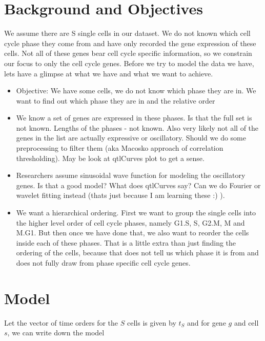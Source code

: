 \documentclass[11pt]{article}
\begin{document}
\section{Background and Objectives}

We assume there are S single cells in our dataset. We do not known which cell cycle phase they come from and have only recorded the gene expression of these cells. Not all of these genes bear cell cycle specific information, so we constrain our focus to only the cell cycle genes. Before we try to model the data we have, lets have a glimpse at what we have and what we want to achieve.

\begin{itemize}

\item  Objective: We have some cells, we do not know which phase they are in. We want to find out which phase they are in and the relative order 

\item We know a set of genes are expressed in these phases. Is that the full set is not known. Lengths of the phases - not known. Also very likely not all of the genes in the list are actually expressive or oscillatory. Should we do some preprocessing to filter them (aka Macosko approach of correlation thresholding). May be look at qtlCurves plot to get a sense. 

\item Researchers assume sinusoidal wave function for modeling the oscillatory genes. Is that a good model? What does qtlCurves say?
Can we do Fourier or wavelet fitting instead (thats just because I am learning these :) ).

\item We want a hierarchical ordering. First we want to group the single cells into the  higher level order of cell cycle phases, namely G1.S, S, G2.M, M and M.G1. But then once we have done that, we also want to reorder the cells inside each of these phases. That is a little extra than just  finding the ordering of the cells, because that does not tell us which phase it is from and does not fully draw from phase specific cell cycle genes.
 
\end{itemize}


\section{Model}

Let the vector of time orders for the $S$ cells is given by $t_{S}$ and for gene $g$ and cell $s$, we can write down the model 
\end{document}
